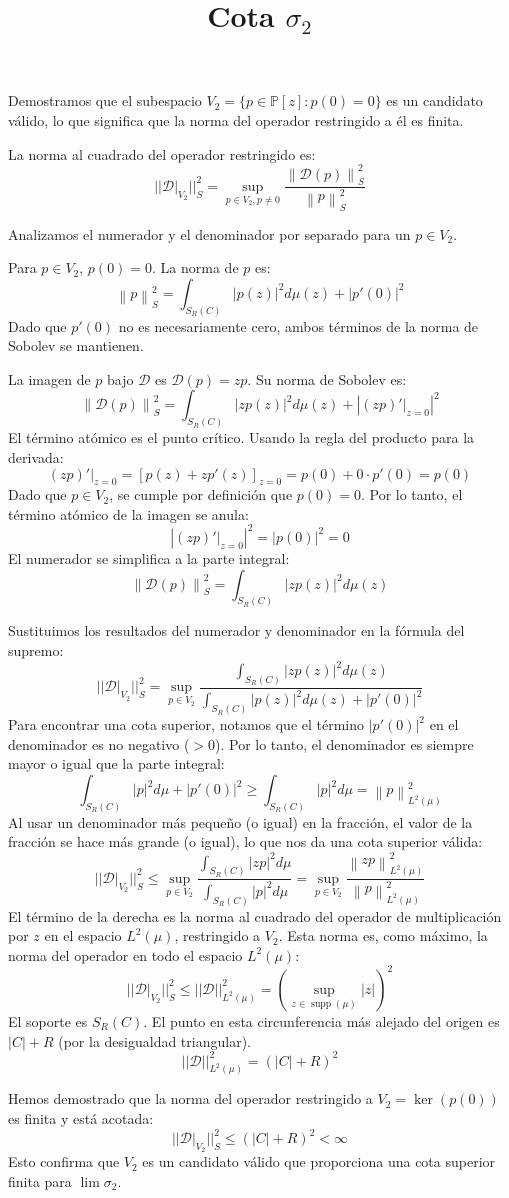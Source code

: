 \documentclass[12pt,a4paper]{article}
\title{Cota $\sigma_2$}
\date{} %
\newcommand{\Poly}{\mathbb{P}[z]}
\newcommand{\D}{\mathcal{D}}
\newcommand{\Vdos}{V_2}
\newcommand{\normS}[1]{\left\| #1 \right\|_S^2}
\newcommand{\normLdos}[1]{\left\| #1 \right\|_{L^2(\mu)}^2}
\newcommand{\ket}[1]{\left| #1 \right|}
\DeclareMathOperator{\supp}{supp}
\begin{document}
\maketitle

Demostramos que el subespacio $V_2 = \{ p \in \Poly : p(0) = 0 \}$ es un candidato válido, lo que significa que la norma del operador restringido a él es finita.

La norma al cuadrado del operador restringido es:
$$ || \D \rvert_{\Vdos} ||_S^2 = \sup_{p \in \Vdos, p \ne 0} \frac{\normS{\D(p)}}{\normS{p}} $$

Analizamos el numerador y el denominador por separado para un $p \in \Vdos$.

Para $p \in \Vdos$, $p(0)=0$. La norma de $p$ es:
$$ \normS{p} = \int_{S_R(C)} |p(z)|^2 d\mu(z) + |p'(0)|^2 $$
Dado que $p'(0)$ no es necesariamente cero, ambos términos de la norma de Sobolev se mantienen.

La imagen de $p$ bajo $\D$ es $\D(p) = zp$. Su norma de Sobolev es:
$$ \normS{\D(p)} = \int_{S_R(C)} |z p(z)|^2 d\mu(z) + \ket{(zp)' \rvert_{z=0}}^2 $$
El término atómico es el punto crítico. Usando la regla del producto para la derivada:
$$ (zp)' \rvert_{z=0} = [p(z) + z p'(z)]_{z=0} = p(0) + 0 \cdot p'(0) = p(0) $$
Dado que $p \in \Vdos$, se cumple por definición que $p(0) = 0$. Por lo tanto, el término atómico de la imagen se anula:
$$ \ket{(zp)' \rvert_{z=0}}^2 = |p(0)|^2 = 0 $$
El numerador se simplifica a la parte integral:
$$ \normS{\D(p)} = \int_{S_R(C)} |z p(z)|^2 d\mu(z) $$

Sustituimos los resultados del numerador y denominador en la fórmula del supremo:
$$ || \D \rvert_{\Vdos} ||_S^2 = \sup_{p \in \Vdos} \frac{\int_{S_R(C)} |z p(z)|^2 d\mu(z)}{\int_{S_R(C)} |p(z)|^2 d\mu(z) + |p'(0)|^2} $$
Para encontrar una cota superior, notamos que el término $|p'(0)|^2$ en el denominador es no negativo ($> 0$). Por lo tanto, el denominador es siempre mayor o igual que la parte integral:
$$ \int_{S_R(C)} |p|^2 d\mu + |p'(0)|^2 \ge \int_{S_R(C)} |p|^2 d\mu = \normLdos{p} $$
Al usar un denominador más pequeño (o igual) en la fracción, el valor de la fracción se hace más grande (o igual), lo que nos da una cota superior válida:
$$ || \D \rvert_{\Vdos} ||_S^2 \le \sup_{p \in \Vdos} \frac{\int_{S_R(C)} |z p|^2 d\mu}{\int_{S_R(C)} |p|^2 d\mu} = \sup_{p \in \Vdos} \frac{\normLdos{zp}}{\normLdos{p}} $$
El término de la derecha es la norma al cuadrado del operador de multiplicación por $z$ en el espacio $L^2(\mu)$, restringido a $\Vdos$. Esta norma es, como máximo, la norma del operador en todo el espacio $L^2(\mu)$:
$$ || \D \rvert_{\Vdos} ||_S^2 \le ||\D||_{L^2(\mu)}^2 = \left( \sup_{z \in \supp(\mu)} |z| \right)^2 $$
El soporte es $S_R(C)$. El punto en esta circunferencia más alejado del origen es $|C|+R$ (por la desigualdad triangular).
$$ ||\D||_{L^2(\mu)}^2 = (|C| + R)^2 $$

Hemos demostrado que la norma del operador restringido a $\Vdos = \ker(p(0))$ es finita y está acotada:
$$ || \D \rvert_{\Vdos} ||_S^2 \le (|C| + R)^2 < \infty $$
Esto confirma que $\Vdos$ es un candidato válido que proporciona una cota superior finita para $\lim \sigma_2$.
\end{document}
